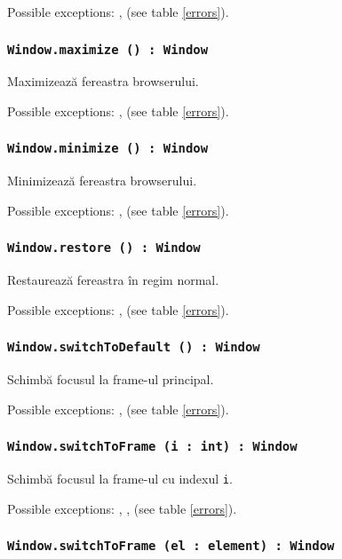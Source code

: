 Possible exceptions: ,  (see table \ref{errors}).

\subsubsection{\texttt{Window.maximize () : Window}}

Maximizează fereastra browserului.

Possible exceptions: ,  (see table \ref{errors}).

\subsubsection{\texttt{Window.minimize () : Window}}

Minimizează fereastra browserului.

Possible exceptions: ,  (see table \ref{errors}).

\subsubsection{\texttt{Window.restore () : Window}}

Restaurează fereastra în regim normal.

Possible exceptions: ,  (see table \ref{errors}).

\subsubsection{\texttt{Window.switchToDefault () : Window}}

Schimbă focusul la frame-ul principal.

Possible exceptions: ,  (see table \ref{errors}).

\subsubsection{\texttt{Window.switchToFrame (i : int) : Window}}

Schimbă focusul la frame-ul cu indexul \texttt{i}.

Possible exceptions: , ,  (see table \ref{errors}).

\subsubsection{\texttt{Window.switchToFrame (el : element) : Window}}

